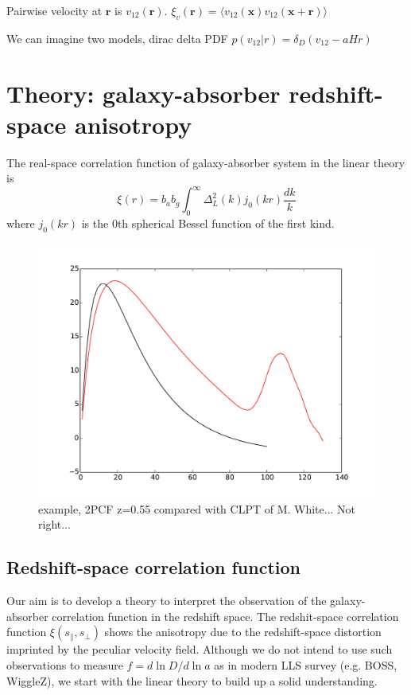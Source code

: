 \documentclass[useAMS,usenatbib,twocolumn]{mn2e}
\begin{document}
Pairwise velocity at $\boldsymbol{r}$ is $v_{12}(\boldsymbol{r})$.
$\xi_v(\boldsymbol{r})=\langle v_{12}(\boldsymbol{x})
v_{12}(\boldsymbol{x}+\boldsymbol{r})\rangle$

We can imagine two models, dirac delta PDF $p(v_{12}|r)=\delta_D(v_{12}-aHr)$





\section{Theory: galaxy-absorber redshift-space anisotropy}
The real-space correlation function of galaxy-absorber system
in the linear theory is
\begin{equation}
\xi(r)=b_a b_g\int_0^\infty\Delta_L^2(k)j_0(kr)\frac{dk}{k}
\end{equation}
where $j_0(kr)$ is the 0th spherical Bessel function of the first kind.

\begin{figure}
 \begin{center}
  \includegraphics[angle=0,width=\columnwidth]{figure/2PCF.pdf}
  \caption{example, 2PCF z=0.55 compared with CLPT of M. White...
  Not right...}
 \end{center}
\end{figure}



\subsection{Redshift-space correlation function}
Our aim is to develop a theory to interpret the observation of the 
galaxy-absorber correlation function in the redshift space. 
The redshit-space correlation function $\xi(s_\parallel,s_\perp)$ shows the 
anisotropy due to the redshift-space distortion imprinted by the peculiar 
velocity field. Although we do not intend to use such observations to measure 
$f=d\ln D/d\ln a$ as in modern LLS survey (e.g. BOSS, WiggleZ), we start with 
the linear theory to build up a solid understanding.
\end{document}

